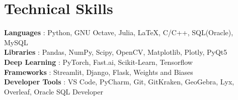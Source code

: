 \documentclass[letterpaper,11pt]{article}
\begin{document}
\section{Technical Skills}
    \begin{itemize}[leftmargin=0.15in, label={}]
    \small{
        \item{
             \textbf
             {Languages}
             {: Python, GNU Octave, Julia, LaTeX, C/C++, SQL(Oracle), MySQL} \\    
             
             \textbf
             {Libraries}
             {: Pandas, NumPy, Scipy, OpenCV, Matplotlib, Plotly, PyQt5} \\
             
             \textbf
             {Deep Learning}
             {: PyTorch, Fast.ai, Scikit-Learn, Tensorflow}\\
             
             \textbf
             {Frameworks}
             {: Streamlit, Django, Flask, Weights and Biases} \\
             
             \textbf
             {Developer Tools}
             {: VS Code, PyCharm, Git, GitKraken, GeoGebra, Lyx, Overleaf, Oracle SQL Developer } \\
        }
    }
    \end{itemize}
\end{document}
